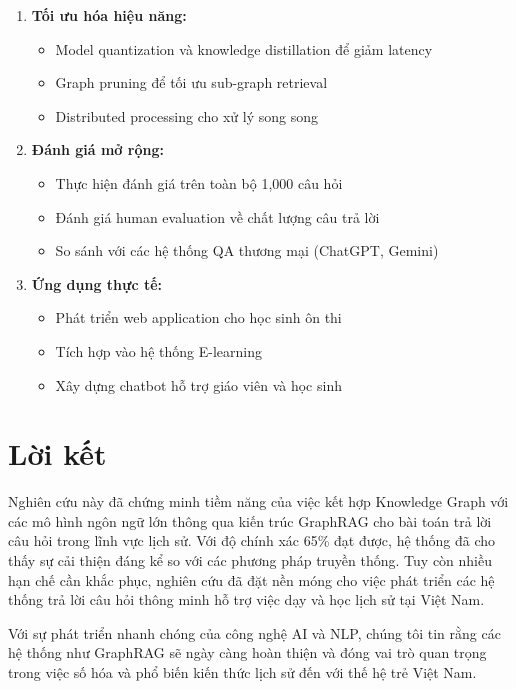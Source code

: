 \begin{enumerate}
    \item \textbf{Tối ưu hóa hiệu năng:}
    \begin{itemize}
        \item Model quantization và knowledge distillation để giảm latency
        \item Graph pruning để tối ưu sub-graph retrieval
        \item Distributed processing cho xử lý song song
    \end{itemize}
    
    \item \textbf{Đánh giá mở rộng:}
    \begin{itemize}
        \item Thực hiện đánh giá trên toàn bộ 1,000 câu hỏi
        \item Đánh giá human evaluation về chất lượng câu trả lời
        \item So sánh với các hệ thống QA thương mại (ChatGPT, Gemini)
    \end{itemize}
    
    \item \textbf{Ứng dụng thực tế:}
    \begin{itemize}
        \item Phát triển web application cho học sinh ôn thi
        \item Tích hợp vào hệ thống E-learning
        \item Xây dựng chatbot hỗ trợ giáo viên và học sinh
    \end{itemize}
\end{enumerate}

\section{Lời kết}

Nghiên cứu này đã chứng minh tiềm năng của việc kết hợp Knowledge Graph với các mô hình ngôn ngữ lớn thông qua kiến trúc GraphRAG cho bài toán trả lời câu hỏi trong lĩnh vực lịch sử. Với độ chính xác 65\% đạt được, hệ thống đã cho thấy sự cải thiện đáng kể so với các phương pháp truyền thống. Tuy còn nhiều hạn chế cần khắc phục, nghiên cứu đã đặt nền móng cho việc phát triển các hệ thống trả lời câu hỏi thông minh hỗ trợ việc dạy và học lịch sử tại Việt Nam.

Với sự phát triển nhanh chóng của công nghệ AI và NLP, chúng tôi tin rằng các hệ thống như GraphRAG sẽ ngày càng hoàn thiện và đóng vai trò quan trọng trong việc số hóa và phổ biến kiến thức lịch sử đến với thế hệ trẻ Việt Nam.
